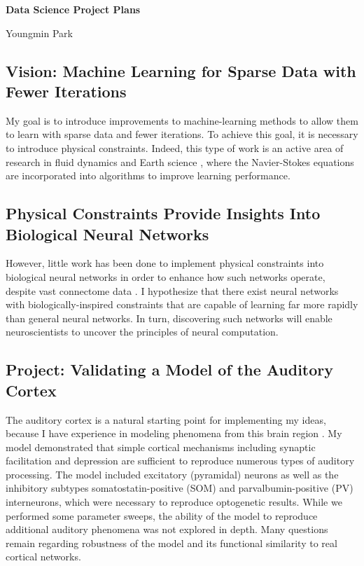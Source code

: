 \documentclass[a4paper,11pt]{article}
\begin{document}
\begin{center}
\Large \textbf{Data Science Project Plans}

\Large Youngmin Park
\end{center}

\subsection*{Vision: Machine Learning for Sparse Data with Fewer Iterations}
My goal is to introduce improvements to machine-learning methods to allow them to learn with sparse data and fewer iterations. To achieve this goal, it is necessary to introduce physical constraints. Indeed, this type of work is an active area of research in fluid dynamics \cite{mohan2020embedding} and Earth science \cite{pelissier2020combining}, where the Navier-Stokes equations are incorporated into algorithms to improve learning performance.

\subsection*{Physical Constraints Provide Insights Into Biological Neural Networks}
However, little work has been done to implement physical constraints into biological neural networks in order to enhance how such networks operate, despite vast connectome data \cite{glasser2011mapping}. I hypothesize that there exist neural networks with biologically-inspired constraints that are capable of learning far more rapidly than general neural networks. In turn, discovering such networks will enable neuroscientists to uncover the principles of neural computation.

\subsection*{Project: Validating a Model of the Auditory Cortex}
The auditory cortex is a natural starting point for implementing my ideas, because I have experience in modeling phenomena from this brain region \cite{park2020circuit}. My model demonstrated that simple cortical mechanisms including synaptic facilitation and depression are sufficient to reproduce numerous types of auditory processing. The model included excitatory (pyramidal) neurons as well as the inhibitory subtypes somatostatin-positive (SOM) and parvalbumin-positive (PV) interneurons, which were necessary to reproduce optogenetic results. While we performed some parameter sweeps, the ability of the model to reproduce additional auditory phenomena was not explored in depth. Many questions remain regarding robustness of the model and its functional similarity to real cortical networks. 
\end{document}
